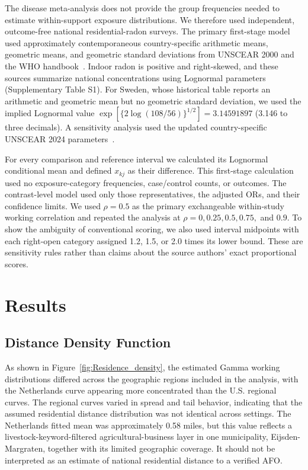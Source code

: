 \documentclass[journal=rsm]{CUP-JNL-DTM}%
\theoremstyle{definition}
\numberwithin{equation}{section}
\begin{document}
The disease meta-analysis does not provide the group frequencies needed to
estimate within-support exposure distributions. We therefore used independent,
outcome-free national residential-radon surveys. The primary first-stage model
used approximately contemporaneous country-specific arithmetic means,
geometric means, and geometric standard deviations from UNSCEAR 2000 and the
WHO handbook~\cite{UNSCEAR2000,WHO2009Radon}. Indoor radon is positive and
right-skewed, and these sources summarize national concentrations using
Lognormal parameters (Supplementary Table S1). For Sweden, whose historical table reports an arithmetic
and geometric mean but no geometric standard deviation, we used the implied
Lognormal value
$\exp[\{2\log(108/56)\}^{1/2}]=3.14591897$ (3.146 to three decimals). A sensitivity analysis used the updated
country-specific UNSCEAR 2024 parameters~\cite{UNSCEAR2024}.

For every comparison and reference interval we calculated its Lognormal
conditional mean and defined $x_{kj}$ as their difference. This first-stage
calculation used no exposure-category frequencies, case/control counts, or
outcomes. The contrast-level model used only those representatives, the
adjusted ORs, and their confidence limits. We used $\rho=0.5$ as the primary
exchangeable within-study working correlation and repeated the analysis at
    $\rho=0,0.25,0.5,0.75,$ and $0.9$. To show the ambiguity of conventional scoring, we also
used interval midpoints with each right-open category assigned 1.2, 1.5, or
2.0 times its lower bound. These are sensitivity rules rather than claims about
the source authors' exact proportional scores.


\section{Results}\label{sec3}

\subsection{Distance Density Function}

As shown in Figure~\ref{fig:Residence_density}, the estimated Gamma working distributions differed across the geographic regions included in the analysis, with the Netherlands curve appearing more concentrated than the U.S. regional curves. The regional curves varied in spread and tail behavior, indicating that the assumed residential distance distribution was not identical across settings. The Netherlands fitted mean was approximately 0.58 miles, but this value reflects a livestock-keyword-filtered agricultural-business layer in one municipality, Eijsden-Margraten, together with its limited geographic coverage. It should not be interpreted as an estimate of national residential distance to a verified AFO.
\end{document}
